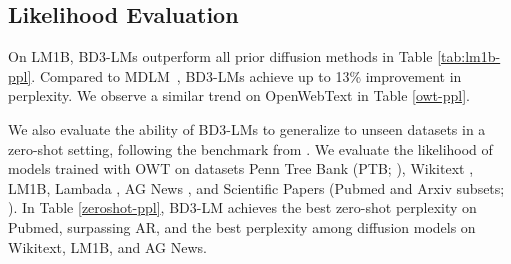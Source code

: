 \documentclass{article} %
\def\algos{BD3-LMs}
\def\algo{BD3-LM}
\def\owt{OWT}
\begin{document}
\subsection{Likelihood Evaluation}
On LM1B, \algos{} outperform all prior diffusion methods in Table \ref{tab:lm1b-ppl}. Compared to MDLM~\citep{sahoo2024simple}, \algos{} achieve up to 13\% improvement in perplexity.  We observe a similar trend on OpenWebText in Table \ref{owt-ppl}.


We also evaluate the ability of \algos{} to generalize to unseen datasets in a zero-shot setting, following the benchmark from \citet{radford2019language}. We evaluate the likelihood of models trained with OWT on datasets Penn Tree Bank (PTB; \citep{marcus1993building}), Wikitext \citep{merity2016pointer}, LM1B, Lambada \citep{paperno-EtAl:2016:P16-1}, AG News \citep{Zhang2015CharacterlevelCN}, and Scientific Papers (Pubmed and Arxiv subsets; \citep{Cohan_2018}). In Table \ref{zeroshot-ppl}, \algo{} achieves the best zero-shot perplexity on Pubmed, surpassing AR, and the best perplexity among diffusion models on Wikitext, LM1B, and AG News.

\end{document}
